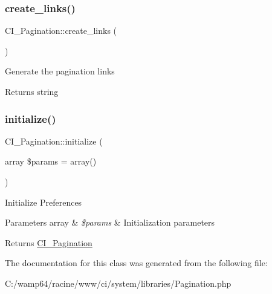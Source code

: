 \subsubsection{\texorpdfstring{create\+\_\+links()}{create\_links()}}
{\footnotesize\ttfamily C\+I\+\_\+\+Pagination\+::create\+\_\+links (\begin{DoxyParamCaption}{ }\end{DoxyParamCaption})}

Generate the pagination links

\begin{DoxyReturn}{Returns}
string 
\end{DoxyReturn}
\mbox{\label{class_c_i___pagination_a7f41ce5c5aa58da0db8cdd248f499cab}} 
\subsubsection{\texorpdfstring{initialize()}{initialize()}}
{\footnotesize\ttfamily C\+I\+\_\+\+Pagination\+::initialize (\begin{DoxyParamCaption}\item[{array}]{\$params = {\ttfamily array()} }\end{DoxyParamCaption})}

Initialize Preferences


\begin{DoxyParams}[1]{Parameters}
array & {\em \$params} & Initialization parameters \\
\hline
\end{DoxyParams}
\begin{DoxyReturn}{Returns}
\mbox{\hyperlink{class_c_i___pagination}{C\+I\+\_\+\+Pagination}} 
\end{DoxyReturn}


The documentation for this class was generated from the following file\+:\begin{DoxyCompactItemize}
\item 
C\+:/wamp64/racine/www/ci/system/libraries/Pagination.\+php\end{DoxyCompactItemize}
